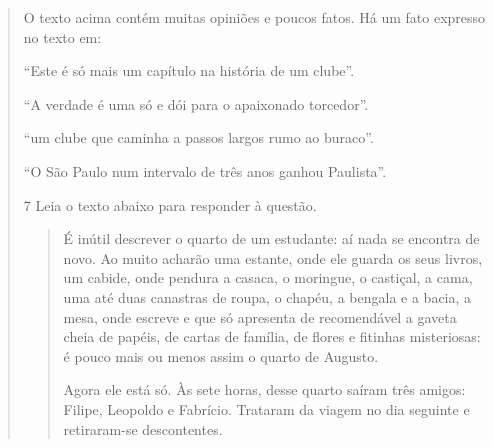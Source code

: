 \begin{quote}
O texto acima contém muitas opiniões e poucos fatos. Há um fato
expresso no texto em:

\begin{escolha}

  \item ``Este é só mais um capítulo na história de um clube''.
  
  \item ``A verdade é uma só e dói para o apaixonado torcedor''.
  
  \item ``um clube que caminha a passos largos rumo ao buraco''.
  
  \item ``O São Paulo num intervalo de três anos ganhou Paulista''.

\end{escolha}


\num{7} Leia o texto abaixo para responder à questão.


\begin{quote}

É inútil descrever o quarto de um estudante: aí nada se
encontra de novo. Ao muito acharão uma estante, onde ele guarda
os seus livros, um cabide, onde pendura a casaca, o moringue, o
castiçal, a cama, uma até duas canastras de roupa, o chapéu, a
bengala e a bacia, a mesa, onde escreve e que só apresenta de
recomendável a gaveta cheia de papéis, de cartas de família, de
flores e fitinhas misteriosas: é pouco mais ou menos assim o
quarto de Augusto.

Agora ele está só. Às sete horas, desse quarto saíram três
amigos: Filipe, Leopoldo e Fabrício. Trataram da viagem no dia 
seguinte e retiraram-se descontentes.

\end{quote}



\end{quote}
